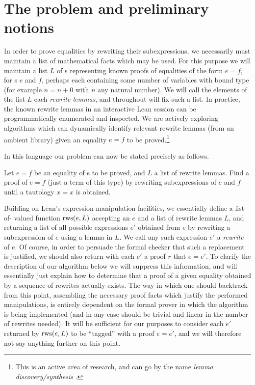 \documentclass[12pt]{easychair}
\begin{document}
\section{The problem and preliminary notions}

In order to prove equalities by rewriting their subexpressions, we necessarily must maintain a list of mathematical facts which may be used. For this purpose we will maintain a list $L$ of s representing known proofs of equalities of the form $e = f$, for \expr{}s $e$ and $f$, perhaps each containing some number of variables with bound type (for example $n = n + 0$ with $n$ any natural number). We will call the elements of the list $L$ each \textit{rewrite lemmas}, and throughout will fix such a list. In practice, the known rewrite lemmas in an interactive Lean session can be programmatically enumerated and inspected. We are actively exploring algorithms which can dynamically identify relevant rewrite lemmas (from an ambient library) given an equality $e = f$ to be proved.\footnote{This is an active area of research, and can go by the name \textit{lemma discovery/synthesis} \cite{heras2013proof}.}

In this language our problem can now be stated precisely as follows.

\begin{prob}
  Let $e = f$ be an equality of \expr{}s to be proved, and $L$ a list of rewrite lemmas. Find a proof of $e = f$ (just a term of this type) by rewriting subexpressions of $e$ and $f$ until a tautology $x = x$ is obtained.
\end{prob}

Building on Lean's expression manipulation facilities, we essentially define a list-of-\expr{} valued function $\operatorname{rws}(e, L)$ accepting an  $e$ and a list of rewrite lemmas $L$, and returning a list of all possible expressions $e'$ obtained from $e$ by rewriting a subexpression of $e$ using a lemma in $L$. We call any such expression $e'$ a \textit{rewrite} of $e$. Of course, in order to persuade the formal checker that such a replacement is justified, we should also return with each \expr{} $e'$ a proof $r$ that $e = e'$. To clarify the description of our algorithm below we will suppress this information, and will essentially just explain how to determine that a proof of a given equality obtained by a sequence of rewrites actually exists. The way in which one should backtrack from this point, assembling the necessary proof facts which justify the performed manipulations, is entirely dependent on the formal prover in which the algorithm is being implemented (and in any case should be trivial and linear in the number of rewrites needed). It will be sufficient for our purposes to consider each $e'$ returned by $\operatorname{rws}(e, L)$ to be ``tagged'' with a proof $e = e'$, and we will therefore not say anything further on this point.
\end{document}
